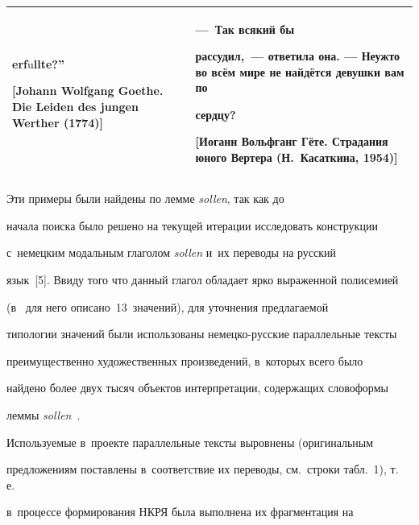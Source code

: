 \begin{table}
\begin{center}
\begin{tabular}{|p{63mm}|p{59mm}|}
erf$\ddot{\mbox{u}}$llte?''\newline


[Johann Wolfgang Goethe. Die Leiden des jungen Werther (1774)]&---~Так всякий бы 


рассудил,~--- ответила она. --- Неужто во всём мире не найдётся девушки вам по 


сердцу?\newline


\newline


[Иоганн Вольфганг Гёте. Страдания юного Вертера (Н.~Касаткина, 1954)]\\


\hline


\end{tabular}


\end{center}




\end{table}





  Эти примеры были найдены по лемме \textit{sollen}, так как до 


начала поиска было решено на текущей итерации исследовать конструкции 


с~немецким модальным глаголом \textit{sollen} и~их переводы на русский 


язык~[5]. Ввиду того что данный глагол обладает ярко выраженной полисемией 


(в~\cite{8-gz} для него описано~13~значений), для уточнения предлагаемой 


типологии значений были использованы немецко-русские параллельные тексты 


преимущественно художественных произведений, в~которых всего было 


найдено более двух тысяч объектов интерпретации, содержащих словоформы 


леммы \textit{sollen}~\cite{6-gz}. %


  


  Используемые в~проекте параллельные тексты выровнены (оригинальным 


предложениям поставлены в~соответствие их переводы, см.\ строки табл.~1), т.\,е.\


 в~процессе формирования НКРЯ была выполнена их фрагментация на 


